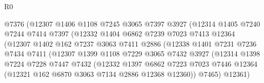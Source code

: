 \begin{lexlean}{R0}
\begin{coremodule}
                              @7376
                              (@12307
                                @1406
                                @1108
                                @7245
                                @3065
                                @7397
                                @3927
                                (@12314
                                  @1405
                                  @7240
                                  @7244
                                  @7414
                                  @7397
                                  (@12332
                                    @1404
                                    @6862
                                    @7239
                                    @7023
                                    @7413
                                    @12364
                                    (@12307
                                      @1402
                                      @162
                                      @7237
                                      @3063
                                      @7411
                                      @2886
                                      (@12338
                                        @1401
                                        @7231
                                        @7236
                                        @7434
                                        @7411
                                        (@12307
                                          @1399
                                          @1108
                                          @7229
                                          @3065
                                          @7432
                                          @3927
                                          (@12314
                                            @1398
                                            @7224
                                            @7228
                                            @7447
                                            @7432
                                            (@12332
                                              @1397
                                              @6862
                                              @7223
                                              @7023
                                              @7446
                                              @12364
                                              (@12321 @162 @6870 @3063 @7134 @2886 @12368 @12360))
                                            @7465)
                                          @12361)

\end{coremodule}
\end{lexlean}
